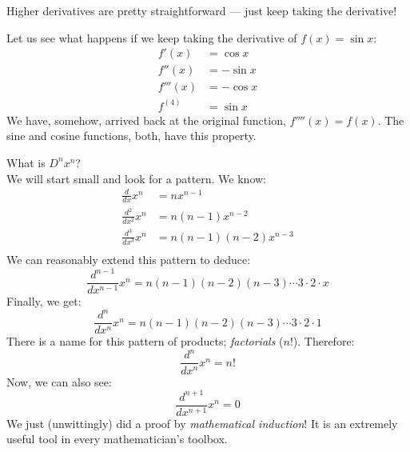 \documentclass[../main.tex]{subfiles}
\begin{document}
Higher derivatives are pretty straightforward --- 
just keep taking the derivative!
\begin{exmp}
    Let us see what happens if we keep taking the derivative of 
    $f(x) = \sin x$:
    \begin{align*}
        f'(x)   &= \cos x   \\
        f''(x)  &= - \sin x \\
        f'''(x) &= - \cos x \\
        f^{(4)} &= \sin x
    \end{align*}
    We have, somehow, arrived back at the original function, 
    $f''''(x) = f(x)$.
    The sine and cosine functions, both, have this property.
\end{exmp}
\begin{exmp}
    What is $D^n x^n$?  \\
    We will start small and look for a pattern. We know:
    \begin{align*}
        \frac{d}{dx} x^n        &= nx^{n - 1}               \\
        \frac{d^2}{dx^2} x^n    &= n(n - 1)x^{n - 2}        \\
        \frac{d^3}{dx^3} x^n    &= n(n - 1)(n - 2)x^{n - 3} \\
    \end{align*}
    We can reasonably extend this pattern to deduce:
    \[
        \frac{d^{n - 1}}{dx^{n - 1}} x^n =
        n(n - 1)(n - 2)(n - 3) \cdots 3 \cdot 2 \cdot x
    \]
    Finally, we get:
    \[
        \frac{d^{n}}{dx^{n}} x^n =
        n(n - 1)(n - 2)(n - 3) \cdots 3 \cdot 2 \cdot 1
    \]
    There is a name for this pattern of products; \emph{factorials} ($n!$).
    Therefore:
    \[ \frac{d^{n}}{dx^{n}} x^n = n! \]
    Now, we can also see:
    \[ \frac{d^{n + 1}}{dx^{n + 1}} x^n = 0 \]
    We just (unwittingly) did a proof by \emph{mathematical induction}! 
    It is an extremely useful tool in every mathematician's toolbox.
\end{exmp}
\end{document}
